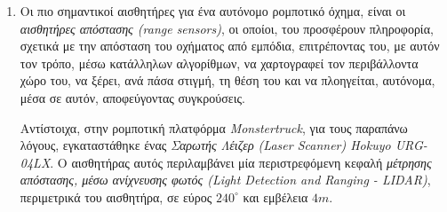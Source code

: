 \bigskip
\begin{enumerate}
\item
Οι πιο σημαντικοί αισθητήρες για ένα αυτόνομο ρομποτικό όχημα, είναι οι \textit{αισθητήρες απόστασης (range sensors)}, οι οποίοι, του προσφέρουν πληροφορία, σχετικά με την απόσταση του οχήματος από εμπόδια, επιτρέποντας του, με αυτόν τον τρόπο, μέσω κατάλληλων αλγορίθμων, να χαρτογραφεί τον περιβάλλοντα χώρο του, να ξέρει, ανά πάσα στιγμή, τη θέση του και να πλοηγείται, αυτόνομα, μέσα σε αυτόν, αποφεύγοντας συγκρούσεις.

Αντίστοιχα, στην ρομποτική πλατφόρμα \textit{Monstertruck}, για τους παραπάνω λόγους, εγκαταστάθηκε ένας \textit{Σαρωτής Λέιζερ (Laser Scanner) Hokuyo URG-04LX}. Ο αισθητήρας αυτός περιλαμβάνει μία περιστρεφόμενη κεφαλή \textit{μέτρησης απόστασης, μέσω ανίχνευσης φωτός (Light Detection and Ranging - LIDAR)}, περιμετρικά του αισθητήρα, σε εύρος $240^{\circ}$ και εμβέλεια $4m$.


\end{enumerate}
